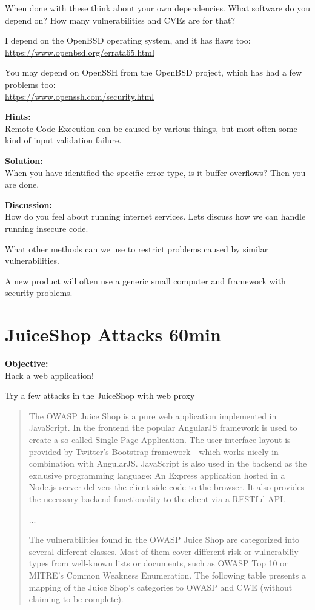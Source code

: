 \documentclass[a4paper,11pt,notitlepage]{report}
\begin{document}
When done with these think about your own dependencies. What software do you depend on? How many vulnerabilities and CVEs are for that?

I depend on the OpenBSD operating system, and it has flaws too:\\
\url{https://www.openbsd.org/errata65.html}

You may depend on OpenSSH from the OpenBSD project, which has had a few problems too:\\
\url{https://www.openssh.com/security.html}

{\bf Hints:}\\
Remote Code Execution can be caused by various things, but most often some kind of input validation failure.

{\bf Solution:}\\
When you have identified the specific error type, is it buffer overflows? Then you are done.

{\bf Discussion:}\\
How do you feel about running internet services. Lets discuss how we can handle running insecure code.

What other methods can we use to restrict problems caused by similar vulnerabilities.

A new product will often use a generic small computer and framework with security problems.

\chapter{JuiceShop Attacks 60min}
\label{ex:juiceshop-attack}


 {\bf Objective:}\\
Hack a web application!

Try a few attacks in the JuiceShop with web proxy

\begin{quote}
The OWASP Juice Shop is a pure web application implemented in JavaScript. In the
frontend the popular AngularJS framework is used to create a so-called Single Page
Application. The user interface layout is provided by Twitter's Bootstrap framework - which
works nicely in combination with AngularJS.
JavaScript is also used in the backend as the exclusive programming language: An Express
application hosted in a Node.js server delivers the client-side code to the browser. It also
provides the necessary backend functionality to the client via a RESTful API.

...

The vulnerabilities found in the OWASP Juice Shop are categorized into several different
classes. Most of them cover different risk or vulnerabiliy types from well-known lists or
documents, such as OWASP Top 10 or MITRE's Common Weakness Enumeration. The
following table presents a mapping of the Juice Shop's categories to OWASP and CWE
(without claiming to be complete).
\end{quote}
\end{document}
